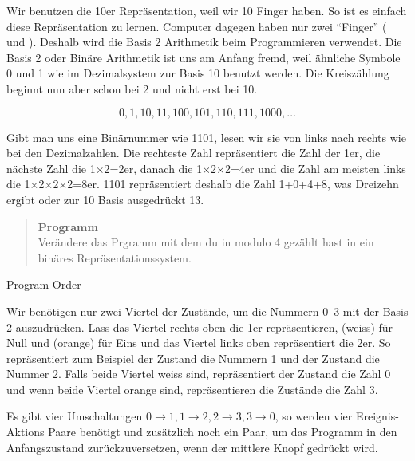 Wir benutzen die 10er Repräsentation, weil wir 10 Finger haben. So ist es einfach diese Repräsentation zu lernen. Computer dagegen haben nur zwei ``Finger'' ( und ).
Deshalb wird die Basis 2 Arithmetik beim Programmieren verwendet. Die Basis 2 oder Binäre Arithmetik ist uns am Anfang fremd, weil ähnliche Symbole 0 und 1 wie im Dezimalsystem zur Basis 10 benutzt werden. Die Kreiszählung beginnt nun aber schon bei 2 und nicht erst bei 10.

\begin{displaymath}
0, 1, 10, 11, 100, 101, 110, 111, 1000, \ldots
\end{displaymath}

Gibt man uns eine Binärnummer wie 1101, lesen wir sie von links nach rechts wie bei den Dezimalzahlen. Die rechteste Zahl repräsentiert die Zahl der 1er, die nächste Zahl die 1$\times$2=2er, danach die 1$\times$2$\times$2=4er und die Zahl am meisten links die 1$\times$2$\times$2$\times$2=8er.
1101 repräsentiert deshalb die Zahl 1+0+4+8, was Dreizehn ergibt oder zur 10 Basis ausgedrückt 13.

\begin{quote}
\textbf{Programm}\\
Verändere das Prgramm mit dem du in modulo 4 gezählt hast in ein binäres Repräsentationssystem.
\end{quote}

{\raggedleft \hfill Program Order }

Wir benötigen nur zwei Viertel der Zustände, um die Nummern 0--3 mit der Basis 2 auszudrücken. Lass das Viertel rechts oben die 1er repräsentieren,  (weiss) für Null und  (orange) für Eins und das Viertel links oben repräsentiert die 2er. So repräsentiert zum Beispiel der Zustand  die Nummern 1 und der Zustand  die Nummer 2.
Falls beide Viertel weiss sind, repräsentiert der Zustand die Zahl 0 und wenn beide Viertel orange sind, repräsentieren die Zustände die Zahl 3.

Es gibt vier Umschaltungen $0\rightarrow 1, 1\rightarrow 2, 2
\rightarrow 3, 3\rightarrow 0$, so werden vier Ereignis-Aktions Paare benötigt und zusätzlich noch ein Paar, um das Programm in den Anfangszustand zurückzuversetzen, wenn der mittlere Knopf gedrückt wird.


\medskip


